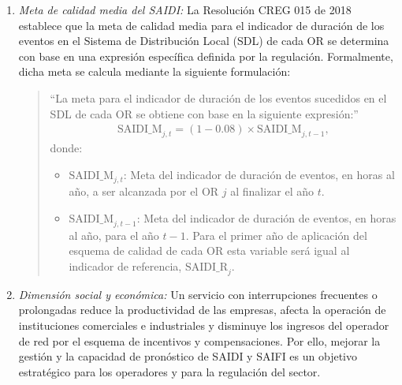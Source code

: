 \begin{enumerate}
          \item \textit{Meta de calidad media del SAIDI:}
           La Resolución CREG 015 de 2018 establece que la meta de calidad media para el indicador de duración de los eventos en el Sistema de Distribución Local (SDL) de cada OR se determina con base en una expresión específica definida por la regulación. Formalmente, dicha meta se calcula mediante la siguiente formulación:
            \begin{quote}
                ``La meta para el indicador de duración de los eventos sucedidos en el SDL de cada OR se obtiene con base en la siguiente expresión:''
                \begin{equation}
                    \begin{aligned}
                    \mathrm{SAIDI\_M}_{j,t} = (1 - 0.08)\times \mathrm{SAIDI\_M}_{j,t-1},
                    \end{aligned}
                    \label{eq:saidi_m_actualizacion}
                \end{equation}
                donde:
                \begin{itemize}
                    \item $\mathrm{SAIDI\_M}_{j,t}$: Meta del indicador de duración de eventos, en horas al año, a ser alcanzada por el OR $j$ al finalizar el año $t$.
                    \item $\mathrm{SAIDI\_M}_{j,t-1}$: Meta del indicador de duración de eventos, en horas al año, para el año $t-1$. Para el primer año de aplicación del esquema de calidad de cada OR esta variable será igual al indicador de referencia, $\mathrm{SAIDI\_R}_{j}$.
                \end{itemize}
            \end{quote}

         \item \textit{Dimensión social y económica:}
          Un servicio con interrupciones frecuentes o prolongadas reduce la productividad de las empresas, afecta la operación de instituciones comerciales e industriales y disminuye los ingresos del operador de red por el esquema de incentivos y compensaciones. Por ello, mejorar la gestión y la capacidad de pronóstico de SAIDI y SAIFI es un objetivo estratégico para los operadores y para la regulación del sector.


\end{enumerate}
